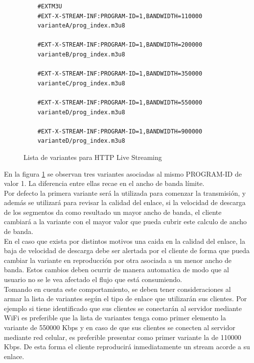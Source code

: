 \begin{figure}[H]
	\centering
	\begin{lstlisting}
	#EXTM3U
	#EXT-X-STREAM-INF:PROGRAM-ID=1,BANDWIDTH=110000
	varianteA/prog_index.m3u8
	
	#EXT-X-STREAM-INF:PROGRAM-ID=1,BANDWIDTH=200000
	varianteB/prog_index.m3u8

	#EXT-X-STREAM-INF:PROGRAM-ID=1,BANDWIDTH=350000
	varianteC/prog_index.m3u8

	#EXT-X-STREAM-INF:PROGRAM-ID=1,BANDWIDTH=550000
	varianteD/prog_index.m3u8

	#EXT-X-STREAM-INF:PROGRAM-ID=1,BANDWIDTH=900000
	varianteD/prog_index.m3u8

	\end{lstlisting}
	\caption{Lista de variantes para HTTP Live Streaming}
	\label{ejemploVariantPLS}	
\end{figure}	

En la figura \ref{ejemploVariantPLS} se observan tres variantes asociadas al mismo PROGRAM-ID de valor 1. La diferencia entre ellas recae en el ancho de banda límite.\\

Por defecto la primera variante será la utilizada para comenzar la transmisión, y además se utilizará para revisar la calidad del enlace, si la velocidad de descarga de los segmentos da como resultado un mayor ancho de banda, el cliente cambiará a la variante con el mayor valor que pueda cubrir este calculo de ancho de banda.\\

En el caso que exista por distintos motivos una caida en la calidad del enlace, la baja de velocidad de descarga debe ser alertada por el cliente de forma que pueda cambiar la variante en reproducción por otra asociada a un menor ancho de banda. Estos cambios deben ocurrir de manera automatica de modo que al usuario no se le vea afectado el flujo que está consumiendo.\\

Tomando en cuenta este comportamiento, se deben tener consideraciones al armar la lista de variantes según el tipo de enlace que utilizarán sus clientes. Por ejemplo si tiene identificado que sus clientes se conectarán al servidor mediante WiFi es preferible que la lista de variantes tenga como primer elemento la variante de 550000 Kbps y en caso de que sus clientes se conecten al servidor mediante red celular, es preferible presentar como primer variante la de 110000 Kbps.
	De esta forma el cliente reproducirá inmediatamente un stream acorde a su enlace. \\
	

